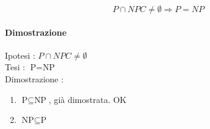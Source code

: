 \begin{equation}
P \cap NPC \neq \emptyset \Rightarrow P = NP
\end{equation}

\paragraph{Dimostrazione}

Ipotesi : $P \cap NPC \neq \emptyset$ \\
Tesi : $\text{P} = \text{NP}$ \\

Dimostrazione : 

\begin{enumerate}
\item $\text{P} \subseteq \text{NP}$, già dimostrata. OK
\item $\text{NP} \subseteq \text{P}$
\end{enumerate}

